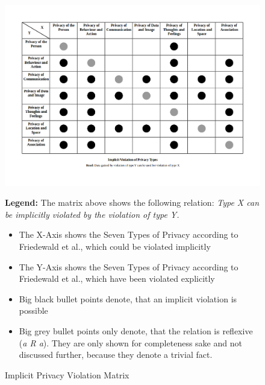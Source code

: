 \begin{figure}[h]
\centering
\includegraphics[width=\textwidth]{diagrams/png/implicit-privacy-violation-matrix.png}

\begin{flushleft}
\scriptsize
\textbf{Legend:}
The matrix above shows the following relation: \emph{Type X can be
implicitly violated by the violation of type Y.}
\begin{itemize}
\itemsep1pt\parskip0pt
\item
  The X-Axis shows the Seven Types of Privacy according to Friedewald et
  al., which could be violated implicitly
\item
  The Y-Axis shows the Seven Types of Privacy according to Friedewald et
  al., which have been violated explicitly
\item
  Big black bullet points denote, that an implicit violation is possible
\item
  Big grey bullet points only denote, that the relation is reflexive
  (\emph{a R a}). They are only shown for completeness sake and not
  discussed further, because they denote a trivial fact.
\end{itemize}
\end{flushleft}

\caption{Implicit Privacy Violation Matrix}
\label{figure:Implicit Privacy Violation Matrix}
\end{figure}

